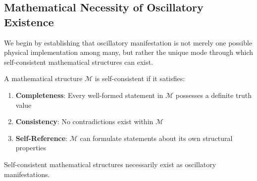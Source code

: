\subsection{Mathematical Necessity of Oscillatory Existence}

We begin by establishing that oscillatory manifestation is not merely one possible physical implementation among many, but rather the unique mode through which self-consistent mathematical structures can exist.

\begin{definition}
A mathematical structure $\mathcal{M}$ is self-consistent if it satisfies:
\begin{enumerate}
\item \textbf{Completeness}: Every well-formed statement in $\mathcal{M}$ possesses a definite truth value
\item \textbf{Consistency}: No contradictions exist within $\mathcal{M}$
\item \textbf{Self-Reference}: $\mathcal{M}$ can formulate statements about its own structural properties
\end{enumerate}
\end{definition}

\begin{theorem}
\label{thm:oscillatory_necessity}
Self-consistent mathematical structures necessarily exist as oscillatory manifestations.
\end{theorem}

